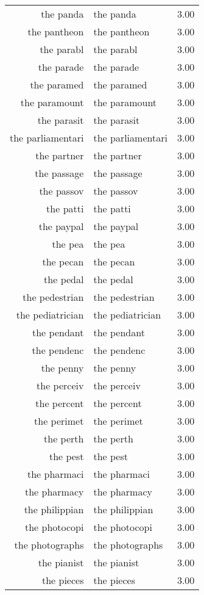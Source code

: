 \begin{table}[ht]
\begin{tabular}{rlr}
  the panda & the panda & 3.00 \\ 
  the pantheon & the pantheon & 3.00 \\ 
  the parabl & the parabl & 3.00 \\ 
  the parade & the parade & 3.00 \\ 
  the paramed & the paramed & 3.00 \\ 
  the paramount & the paramount & 3.00 \\ 
  the parasit & the parasit & 3.00 \\ 
  the parliamentari & the parliamentari & 3.00 \\ 
  the partner & the partner & 3.00 \\ 
  the passage & the passage & 3.00 \\ 
  the passov & the passov & 3.00 \\ 
  the patti & the patti & 3.00 \\ 
  the paypal & the paypal & 3.00 \\ 
  the pea & the pea & 3.00 \\ 
  the pecan & the pecan & 3.00 \\ 
  the pedal & the pedal & 3.00 \\ 
  the pedestrian & the pedestrian & 3.00 \\ 
  the pediatrician & the pediatrician & 3.00 \\ 
  the pendant & the pendant & 3.00 \\ 
  the pendenc & the pendenc & 3.00 \\ 
  the penny & the penny & 3.00 \\ 
  the perceiv & the perceiv & 3.00 \\ 
  the percent & the percent & 3.00 \\ 
  the perimet & the perimet & 3.00 \\ 
  the perth & the perth & 3.00 \\ 
  the pest & the pest & 3.00 \\ 
  the pharmaci & the pharmaci & 3.00 \\ 
  the pharmacy & the pharmacy & 3.00 \\ 
  the philippian & the philippian & 3.00 \\ 
  the photocopi & the photocopi & 3.00 \\ 
  the photographs & the photographs & 3.00 \\ 
  the pianist & the pianist & 3.00 \\ 
  the pieces & the pieces & 3.00 \\ 

\end{tabular}
\end{table}
